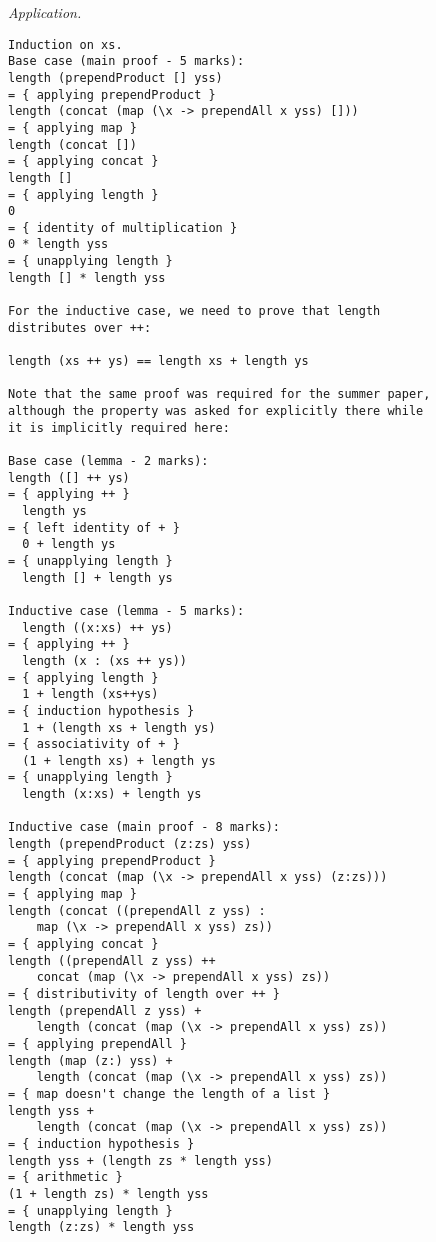 \begin{parts}
    \begin{solution}
        \emph{Application.}
\begin{verbatim}
Induction on xs.
Base case (main proof - 5 marks):
length (prependProduct [] yss)
= { applying prependProduct }
length (concat (map (\x -> prependAll x yss) []))
= { applying map }
length (concat [])
= { applying concat }
length []
= { applying length }
0
= { identity of multiplication }
0 * length yss
= { unapplying length }
length [] * length yss

For the inductive case, we need to prove that length 
distributes over ++:

length (xs ++ ys) == length xs + length ys

Note that the same proof was required for the summer paper, 
although the property was asked for explicitly there while 
it is implicitly required here:

Base case (lemma - 2 marks):
length ([] ++ ys) 
= { applying ++ }
  length ys 
= { left identity of + }
  0 + length ys
= { unapplying length }
  length [] + length ys

Inductive case (lemma - 5 marks):
  length ((x:xs) ++ ys)
= { applying ++ }
  length (x : (xs ++ ys))
= { applying length }
  1 + length (xs++ys)
= { induction hypothesis }
  1 + (length xs + length ys)
= { associativity of + }
  (1 + length xs) + length ys
= { unapplying length }
  length (x:xs) + length ys

Inductive case (main proof - 8 marks):
length (prependProduct (z:zs) yss)
= { applying prependProduct } 
length (concat (map (\x -> prependAll x yss) (z:zs)))
= { applying map }
length (concat ((prependAll z yss) : 
    map (\x -> prependAll x yss) zs))
= { applying concat }
length ((prependAll z yss) ++ 
    concat (map (\x -> prependAll x yss) zs))
= { distributivity of length over ++ } 
length (prependAll z yss) + 
    length (concat (map (\x -> prependAll x yss) zs))
= { applying prependAll }
length (map (z:) yss) + 
    length (concat (map (\x -> prependAll x yss) zs))
= { map doesn't change the length of a list }
length yss + 
    length (concat (map (\x -> prependAll x yss) zs))
= { induction hypothesis }
length yss + (length zs * length yss) 
= { arithmetic }
(1 + length zs) * length yss
= { unapplying length }
length (z:zs) * length yss 
\end{verbatim}
    \end{solution}
\end{parts}
